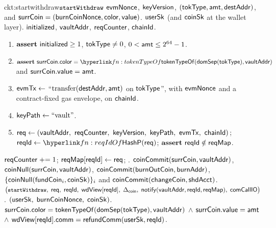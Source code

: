 \begin{CktBox}{ckt:startwithdraw}{$\texttt{\small startWithdraw}$}
 $\mathsf{evmNonce}$, $\mathsf{keyVersion}$, $(\mathsf{tokType}, \mathsf{amt}, \mathsf{destAddr})$, and
$\mathsf{surrCoin} = (\mathsf{burnCoinNonce}, \mathsf{color}, \mathsf{value})$.
 $\mathsf{userSk}$ (and $\mathsf{coinSk}$ at the wallet layer).
 $\mathsf{initialized}$, $\mathsf{vaultAddr}$, $\mathsf{reqCounter}$, $\mathsf{chainId}$.
\begin{enumerate}[nosep,leftmargin=1.7em,topsep=2pt]
\item $\textbf{assert}~ \mathsf{initialized} \geq 1$, \; $\mathsf{tokType} \neq 0$, \; $0 < \mathsf{amt} \leq 2^{64}-1$.
\item $\assert \coinIn.\mathsf{color} =
      \lnk{fn:tokenTypeOf}{\tokenTypeOf(\domSep(\tokType), \vaultAddr)}$ \; and \;
      $\mathsf{surrCoin}.\mathsf{value} = \mathsf{amt}$.
\item $\mathsf{evmTx} \gets$ ``$\text{transfer}(\mathsf{destAddr}, \mathsf{amt})$ on $\mathsf{tokType}$'', with $\mathsf{evmNonce}$ and a
      contract-fixed gas envelope, on $\mathsf{chainId}$.
\item $\mathsf{keyPath} \gets \text{``vault''}$.
\item $\req \gets (\vaultAddr\bc \sigNonce\bc \keyVer\bc \keyPath\bc \evmTxOf\bc \chainId)$; \;
      $\rid \gets \lnk{fn:reqIdOf}{\reqIdOf(\req)}$; \; $\textbf{assert}~ \mathsf{reqId} \notin \mathsf{reqMap}$.
\end{enumerate}
\begin{OutList}
\oitem{\Dvault} $\mathsf{reqCounter} \mathrel{+}= 1$; \; $\mathsf{reqMap}[\mathsf{reqId}] \gets \mathsf{req}$; \;
  .
\oitem{\Dshd} \bluedot $\mathsf{coinCommit}(\mathsf{surrCoin}, \mathsf{vaultAddr})$, \;
  \bluedot $\mathsf{coinNull}(\mathsf{surrCoin}, \mathsf{vaultAddr})$, \;
  \bluedot $\mathsf{coinCommit}(\mathsf{burnOutCoin}, \mathsf{burnAddr})$, \;
  \bluedot $\{\mathsf{coinNull}(\mathsf{fundCoin}_i, \mathsf{coinSk})\}_i$ and $\mathsf{coinCommit}(\mathsf{changeCoin}, \mathsf{shdAcct})$.
\oitem{\stmt} $\bigl(\texttt{\small startWithdraw},\; \mathsf{req},\; \mathsf{reqId},\; \mathsf{wdView}[\mathsf{reqId}],\; \Delta_{\mathsf{coin}},\;
  \mathsf{notify}(\mathsf{vaultAddr}, \mathsf{reqId}, \mathsf{reqMap}),\; \mathsf{comCallIO}\bigr)$.
\oitem{\wit} $(\mathsf{userSk},\; \mathsf{burnCoinNonce},\; \mathsf{coinSk})$.
\oitem{\Rel} $\mathsf{surrCoin}.\mathsf{color} = \mathsf{tokenTypeOf}(\mathsf{domSep}(\mathsf{tokType}), \mathsf{vaultAddr})$ \;$\wedge$\;
  $\mathsf{surrCoin}.\mathsf{value} = \mathsf{amt}$ \;$\wedge$\;
  $\mathsf{wdView}[\mathsf{reqId}].\mathsf{comm} = \mathsf{refundComm}(\mathsf{userSk}, \mathsf{reqId})$.
\end{OutList}
\end{CktBox}


